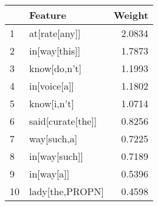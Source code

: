 \begin{tabular}{llr}
\toprule
{} &            Feature &  Weight \\
\midrule
1  &      at[rate[any]] &  2.0834 \\
2  &      in[way[this]] &  1.7873 \\
3  &       know[do,n't] &  1.1993 \\
4  &       in[voice[a]] &  1.1802 \\
5  &        know[i,n't] &  1.0714 \\
6  &  said[curate[the]] &  0.8256 \\
7  &        way[such,a] &  0.7225 \\
8  &      in[way[such]] &  0.7189 \\
9  &         in[way[a]] &  0.5396 \\
10 &    lady[the,PROPN] &  0.4598 \\
\bottomrule
\end{tabular}
